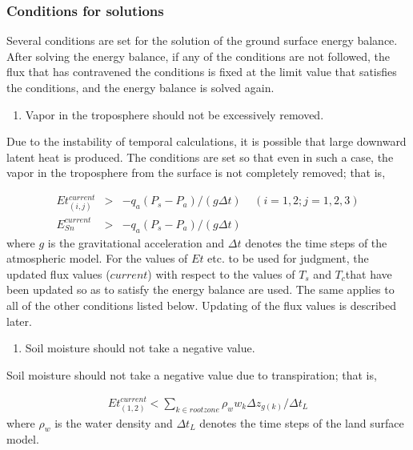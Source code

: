 \hypertarget{conditions-for-solutions}{%
\subsubsection{Conditions for solutions}\label{conditions-for-solutions}}

Several conditions are set for the solution of the ground surface energy balance. After solving the energy balance, if any of the conditions are not followed, the flux that has contravened the
conditions is fixed at the limit value that satisfies the conditions, and the energy balance is solved again.

\begin{enumerate}
\def\labelenumi{\arabic{enumi}.}
\tightlist
\item
  Vapor in the troposphere should not be excessively removed.
\end{enumerate}

Due to the instability of temporal calculations, it is possible that large downward latent heat is produced. The conditions are set so that even in such a case, the vapor in the troposphere from the
surface is not completely removed; that is,

\begin{eqnarray}
  Et_{(i,j)}^{current} &>& - q_a ( P_s - P_a ) / (g \Delta t)
   \ \ \ \ \ (i=1,2 ; j=1,2,3) \\
  E_{Sn}^{current} &>& - q_a ( P_s - P_a ) / (g \Delta t)
\end{eqnarray} where \(g\) is the gravitational acceleration and \(\Delta t\) denotes the time steps of the atmospheric model. For the values of \(Et\) etc. to be used for judgment, the updated flux values
(\(current\)) with respect to the values of \(T_s\) and \(T_c\)that have been updated so as to satisfy the energy balance are used. The same applies to all of the other conditions listed below.
Updating of the flux values is described later.

\begin{enumerate}
\def\labelenumi{\arabic{enumi}.}
\setcounter{enumi}{1}
\tightlist
\item
  Soil moisture should not take a negative value.
\end{enumerate}

Soil moisture should not take a negative value due to transpiration; that is,

\begin{eqnarray}
   Et_{(1,2)}^{current} <
     \sum_{k\in rootzone} \rho_w w_{k}\Delta z_{g(k)} /\Delta t_L
\end{eqnarray} where \(\rho_w\) is the water density and \(\Delta t_L\) denotes the time steps of the land surface model.

